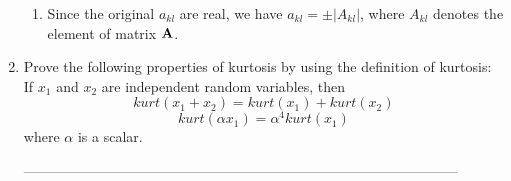 \documentclass[10pt]{article}
\begin{document}
\begin{enumerate}
\begin{enumerate}
  \item Since the original $a_{kl}$ are real, we have $a_{kl} = \pm
    |A_{kl}|$, where $A_{kl}$ denotes the element of matrix $\bf{A}$.
  \end{enumerate}


\vspace{2mm}

\vspace{2cm}
\item Prove the following properties of kurtosis by using the definition of kurtosis:
  If $x_1$ and $x_2$ are independent random variables, then
  \begin{displaymath}
    kurt(x_1 + x_2) = kurt(x_1) + kurt(x_2)
  \end{displaymath}
  \begin{displaymath}
    kurt(\alpha x_1) = \alpha^4 kurt(x_1)
  \end{displaymath}
  where $\alpha$ is a scalar.
  
---------------------------------------------------------------------------------------------


\end{enumerate}
\end{document}
